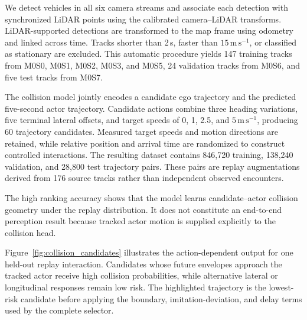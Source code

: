 We detect vehicles in all six camera streams and associate each detection with synchronized LiDAR points using the calibrated camera--LiDAR transforms. LiDAR-supported detections are transformed to the map frame using odometry and linked across time. Tracks shorter than 2\,s, faster than $15\,\mathrm{m\,s^{-1}}$, or classified as stationary are excluded. This automatic procedure yields 147 training tracks from M0S0, M0S1, M0S2, M0S3, and M0S5, 24 validation tracks from M0S6, and five test tracks from M0S7.

The collision model jointly encodes a candidate ego trajectory and the predicted five-second actor trajectory. Candidate actions combine three heading variations, five terminal lateral offsets, and target speeds of 0, 1, 2.5, and $5\,\mathrm{m\,s^{-1}}$, producing 60 trajectory candidates. Measured target speeds and motion directions are retained, while relative position and arrival time are randomized to construct controlled interactions. The resulting dataset contains 846,720 training, 138,240 validation, and 28,800 test trajectory pairs. These pairs are replay augmentations derived from 176 source tracks rather than independent observed encounters.

\begin{table}[t]
\centering
\caption{Action-conditioned collision prediction on 28,800 M0S7 replay pairs. Results are mean $\pm$ standard deviation over three training seeds.}
\label{tab:collision_prediction}
\end{table}

The high ranking accuracy shows that the model learns candidate--actor collision geometry under the replay distribution. It does not constitute an end-to-end perception result because tracked actor motion is supplied explicitly to the collision head.

Figure~\ref{fig:collision_candidates} illustrates the action-dependent output for one held-out replay interaction. Candidates whose future envelopes approach the tracked actor receive high collision probabilities, while alternative lateral or longitudinal responses remain low risk. The highlighted trajectory is the lowest-risk candidate before applying the boundary, imitation-deviation, and delay terms used by the complete selector.

